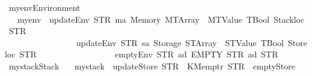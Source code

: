 \begin{isabellebody}
\isamarkupfalse%
\ myenv{\isacharcolon}{\kern0pt}{\isacharcolon}{\kern0pt}Environment\isanewline
\ \ \ {\isachardoublequoteopen}myenv\ {\isasymequiv}\ updateEnv\ {\isacharparenleft}{\kern0pt}STR\ {\isacharprime}{\kern0pt}{\isacharprime}{\kern0pt}ma{\isacharprime}{\kern0pt}{\isacharprime}{\kern0pt}{\isacharparenright}{\kern0pt}\ {\isacharparenleft}{\kern0pt}Memory\ {\isacharparenleft}{\kern0pt}MTArray\ {}\ {\isacharparenleft}{\kern0pt}MTValue\ TBool{\isacharparenright}{\kern0pt}{\isacharparenright}{\kern0pt}{\isacharparenright}{\kern0pt}\ {\isacharparenleft}{\kern0pt}Stackloc\ {\isacharparenleft}{\kern0pt}STR\ {\isacharprime}{\kern0pt}{\isacharprime}{\kern0pt}{}{\isacharprime}{\kern0pt}{\isacharprime}{\kern0pt}{\isacharparenright}{\kern0pt}{\isacharparenright}{\kern0pt}\isanewline
\ \ \ \ \ \ \ \ \ \ \ \ \ \ \ \ \ {\isacharparenleft}{\kern0pt}updateEnv\ {\isacharparenleft}{\kern0pt}STR\ {\isacharprime}{\kern0pt}{\isacharprime}{\kern0pt}sa{\isacharprime}{\kern0pt}{\isacharprime}{\kern0pt}{\isacharparenright}{\kern0pt}\ {\isacharparenleft}{\kern0pt}Storage\ {\isacharparenleft}{\kern0pt}STArray\ {}\ {\isacharparenleft}{\kern0pt}STValue\ TBool{\isacharparenright}{\kern0pt}{\isacharparenright}{\kern0pt}{\isacharparenright}{\kern0pt}\ {\isacharparenleft}{\kern0pt}Storeloc\ {\isacharparenleft}{\kern0pt}STR\ {\isacharprime}{\kern0pt}{\isacharprime}{\kern0pt}{}{\isacharprime}{\kern0pt}{\isacharprime}{\kern0pt}{\isacharparenright}{\kern0pt}{\isacharparenright}{\kern0pt}\isanewline
\ \ \ \ \ \ \ \ \ \ \ \ \ \ \ \ \ {\isacharparenleft}{\kern0pt}emptyEnv\ {\isacharparenleft}{\kern0pt}STR\ {\isacharprime}{\kern0pt}{\isacharprime}{\kern0pt}ad{\isacharprime}{\kern0pt}{\isacharprime}{\kern0pt}{\isacharparenright}{\kern0pt}\ EMPTY\ {\isacharparenleft}{\kern0pt}STR\ {\isacharprime}{\kern0pt}{\isacharprime}{\kern0pt}ad{\isacharprime}{\kern0pt}{\isacharprime}{\kern0pt}{\isacharparenright}{\kern0pt}\ {\isacharparenleft}{\kern0pt}STR\ {\isacharprime}{\kern0pt}{\isacharprime}{\kern0pt}{}{\isacharprime}{\kern0pt}{\isacharprime}{\kern0pt}{\isacharparenright}{\kern0pt}{\isacharparenright}{\kern0pt}{\isacharparenright}{\kern0pt}{\isachardoublequoteclose}\isanewline
\ \isanewline
{}\isamarkupfalse%
\ mystack{\isacharcolon}{\kern0pt}{\isacharcolon}{\kern0pt}Stack\isanewline
\ \ \ {\isachardoublequoteopen}mystack\ {\isasymequiv}\ updateStore\ {\isacharparenleft}{\kern0pt}STR\ {\isacharprime}{\kern0pt}{\isacharprime}{\kern0pt}{}{\isacharprime}{\kern0pt}{\isacharprime}{\kern0pt}{\isacharparenright}{\kern0pt}\ {\isacharparenleft}{\kern0pt}KMemptr\ {\isacharparenleft}{\kern0pt}STR\ {\isacharprime}{\kern0pt}{\isacharprime}{\kern0pt}{}{\isacharprime}{\kern0pt}{\isacharprime}{\kern0pt}{\isacharparenright}{\kern0pt}{\isacharparenright}{\kern0pt}\ emptyStore{\isachardoublequoteclose}\isanewline

\end{isabellebody}
